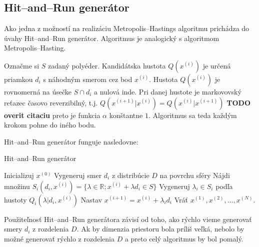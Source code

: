 \subsection{Hit--and--Run generátor}

Ako jedna z možností na realizáciu Metropolis--Hastings algoritmu prichádza do úvahy Hit--and--Run generátor. Algoritmus je analogický s algoritmom Metropolis--Hasting.

Označme si $S$ zadaný polyéder. Kandidátska hustota $Q(x^{(i)})$ je určená priamkou $d_i$ s náhodným smerom cez bod $x^{(i)}$. Hustota $Q(x^{(i)})$ je rovnomerná na úsečke $S \cap d_i$ a nulová inde. Pri danej hustote je markovovský reťazec časovo reverzibilný, t.j. $Q(x^{(i+1)}|x^{(i)})=Q(x^{(i)}|x^{(i+1)})$ \cite{hit-and-run_chen} \textbf{TODO overit citaciu} preto je funkcia $\alpha$ konštantne $1$. Algoritmus sa teda každým krokom pohne do iného bodu.

Hit--and--Run generátor funguje nasledovne:

\begin{algorithm}[H]
	\caption{Hit--and--Run generátor \cite{hit-and-run_chen}}
	\label{hit--and--run}
	\begin{algorithmic}[1]
		\State Inicializuj $x^{(0)}$
			\State Vygeneruj smer $d_i$ z distribúcie $D$ na povrchu sféry
			\State Nájdi množinu $S_i(d_i,x^{(i)})=\{\lambda \in \mathbb{R}; x^{(i)} + \lambda d_i \in S \} $
			\State Vygeneruj $\lambda_i \in S_i$ podľa hustoty $Q_i(\lambda | d_i, x^{(i)})$
			\State Nastav $x^{(i+1)}=x^{(i)}+\lambda_i d_i$
		\EndFor
		\State Vráť $x^{(1)},x^{(2)},\dots,x^{(N)}$.
	\end{algorithmic}
\end{algorithm}

Použiteľnosť Hit--and--Run generátora závisí od toho, ako rýchlo vieme generovať smery $d_i$ z rozdelenia $D$. Ak by dimenzia priestoru bola príliš veľká, nebolo by možné generovať rýchlo z rozdelenia $D$ a preto celý algoritmus by bol pomalý.


